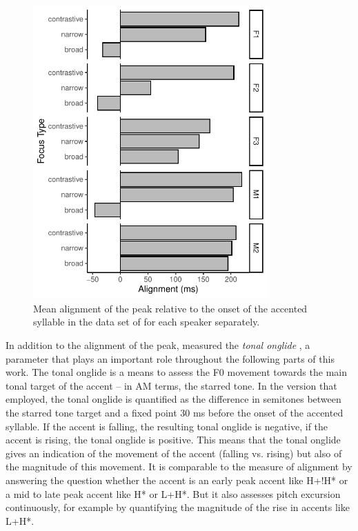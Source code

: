 \begin{figure}
\includegraphics[width=9cm]{figures/ch4/Grice_etal_Alignment.pdf}
\caption{Mean alignment of the peak relative to the onset of the accented syllable in the data set of \citet{Griceetal2017} for each speaker separately.}
\label{fig:grice_etal_2017_alignment}
\end{figure}

In addition to the alignment of the peak, \citet{Griceetal2017} measured the \emph{tonal onglide} \citep{RitterGrice2015}, a parameter that plays an important role throughout the following parts of this work. The tonal onglide is a means to assess the F0 movement towards the main tonal target of the accent -- in AM terms, the starred tone. In the version that \citet{Griceetal2017} employed, the tonal onglide is quantified as the difference in semitones between the starred tone target and a fixed point 30 ms before the onset of the accented syllable. If the accent is falling, the resulting tonal onglide is negative, if the accent is rising, the tonal onglide is positive. This means that the tonal onglide gives an indication of the movement of the accent (falling vs. rising) but also of the magnitude of this movement. It is comparable to the measure of alignment by answering the question whether the accent is an early peak accent like H+!H* or a mid to late peak accent like H* or L+H*. But it also assesses pitch excursion continuously, for example by quantifying the magnitude of the rise in accents like L+H*.

